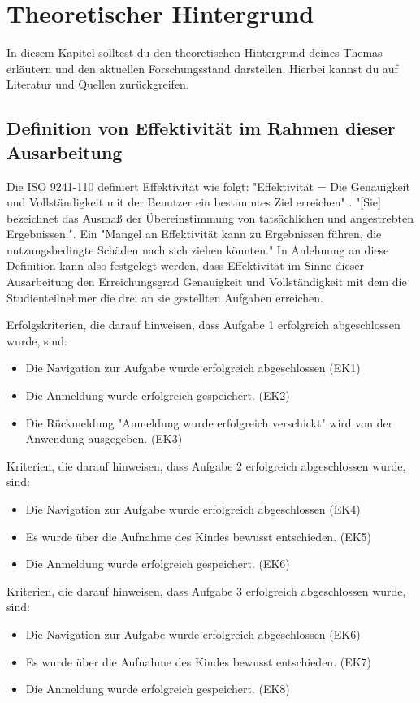 \section{Theoretischer Hintergrund}
In diesem Kapitel solltest du den theoretischen Hintergrund deines Themas erläutern und den aktuellen Forschungsstand darstellen. Hierbei kannst du auf Literatur und Quellen zurückgreifen.

\subsection{Definition von Effektivität im Rahmen dieser Ausarbeitung }
Die ISO 9241-110 definiert Effektivität wie folgt: "Effektivität = Die Genauigkeit und Vollständigkeit mit der Benutzer ein bestimmtes Ziel erreichen" \cite{ISO-9241-110}. 
"[Sie] bezeichnet das Ausmaß der Übereinstimmung von tatsächlichen und angestrebten Ergebnissen."\cite{iso-9241-11}. Ein "Mangel an Effektivität kann zu Ergebnissen führen, die nutzungsbedingte Schäden nach sich ziehen könnten."\cite{iso-9241-11}
In Anlehnung an diese Definition kann also festgelegt werden, dass Effektivität im Sinne dieser Ausarbeitung den Erreichungsgrad Genauigkeit und Vollständigkeit mit dem die Studienteilnehmer die drei an sie gestellten Aufgaben erreichen. 

Erfolgskriterien, die darauf hinweisen, dass Aufgabe 1 erfolgreich abgeschlossen wurde, sind: 
\begin{itemize}
    \item Die Navigation zur Aufgabe wurde erfolgreich abgeschlossen (EK1)
    \item Die Anmeldung wurde erfolgreich gespeichert. (EK2)
    \item Die Rückmeldung "Anmeldung wurde erfolgreich verschickt" wird von der Anwendung ausgegeben. (EK3)
\end{itemize}

Kriterien, die darauf hinweisen, dass Aufgabe 2 erfolgreich abgeschlossen wurde, sind: 
\begin{itemize}
    \item Die Navigation zur Aufgabe wurde erfolgreich abgeschlossen (EK4)
    \item Es wurde über die Aufnahme des Kindes bewusst entschieden. (EK5)
    \item Die Anmeldung wurde erfolgreich gespeichert. (EK6)
\end{itemize}

Kriterien, die darauf hinweisen, dass Aufgabe 3 erfolgreich abgeschlossen wurde, sind: 
\begin{itemize}
    \item Die Navigation zur Aufgabe wurde erfolgreich abgeschlossen (EK6)
    \item Es wurde über die Aufnahme des Kindes bewusst entschieden. (EK7)
    \item Die Anmeldung wurde erfolgreich gespeichert. (EK8)
\end{itemize}

